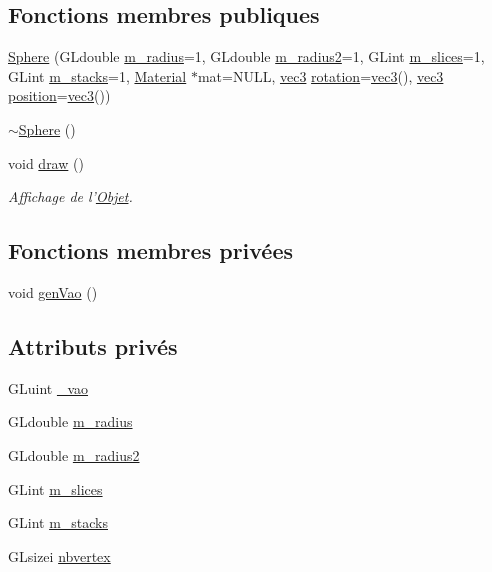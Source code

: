 \subsection*{Fonctions membres publiques}
\begin{DoxyCompactItemize}
\item 
\hyperlink{class_sphere_ae6811ba8643126e4f3a7443d752c49b0}{Sphere} (G\+Ldouble \hyperlink{class_sphere_a4b019bb4bf74ac28ab56d5ae2c9ca6ea}{m\+\_\+radius}=1, G\+Ldouble \hyperlink{class_sphere_aa3ec1c07df539131c0fb886fe9c619fd}{m\+\_\+radius2}=1, G\+Lint \hyperlink{class_sphere_a6ddad99936fa616fa04862aa92e20105}{m\+\_\+slices}=1, G\+Lint \hyperlink{class_sphere_aef79b7beb9d008e8dcc0849fbe691072}{m\+\_\+stacks}=1, \hyperlink{class_material}{Material} $\ast$mat=N\+U\+L\+L, \hyperlink{structvec3}{vec3} \hyperlink{class_objet_ac69a1b459bcb4433099c8cfbff06b209}{rotation}=\hyperlink{structvec3}{vec3}(), \hyperlink{structvec3}{vec3} \hyperlink{class_objet_a0e109bc790b14328202dd2546b04e2fd}{position}=\hyperlink{structvec3}{vec3}())
\item 
\hyperlink{class_sphere_a569c071e50a3e11f678630ee1a17737e}{$\sim$\+Sphere} ()
\item 
void \hyperlink{class_sphere_a34a34167b7544c95155d3ff30638d045}{draw} ()
\begin{DoxyCompactList}\small\item\em Affichage de l'\hyperlink{class_objet}{Objet}. \end{DoxyCompactList}\end{DoxyCompactItemize}
\subsection*{Fonctions membres privées}
\begin{DoxyCompactItemize}
\item 
void \hyperlink{class_sphere_aacaf4cf9d7810dffd8c81c8c8298a95b}{gen\+Vao} ()
\end{DoxyCompactItemize}
\subsection*{Attributs privés}
\begin{DoxyCompactItemize}
\item 
G\+Luint \hyperlink{class_sphere_a18d31b1d011d5c5e452b9b9b6f54b10f}{\+\_\+vao}
\item 
G\+Ldouble \hyperlink{class_sphere_a4b019bb4bf74ac28ab56d5ae2c9ca6ea}{m\+\_\+radius}
\item 
G\+Ldouble \hyperlink{class_sphere_aa3ec1c07df539131c0fb886fe9c619fd}{m\+\_\+radius2}
\item 
G\+Lint \hyperlink{class_sphere_a6ddad99936fa616fa04862aa92e20105}{m\+\_\+slices}
\item 
G\+Lint \hyperlink{class_sphere_aef79b7beb9d008e8dcc0849fbe691072}{m\+\_\+stacks}
\item 
G\+Lsizei \hyperlink{class_sphere_a4e8e9f5ba889e700b7244bc70232a271}{nbvertex}
\end{DoxyCompactItemize}
